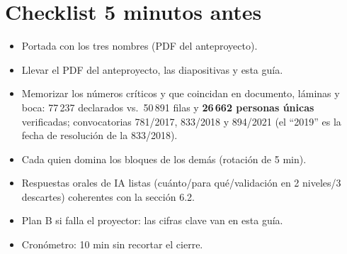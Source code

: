 \documentclass[11pt,a4paper]{article}
\begin{document}
\section*{Checklist 5 minutos antes}
\begin{itemize}
  \item [$\square$] Portada con los tres nombres (PDF del anteproyecto).
  \item [$\square$] Llevar el PDF del anteproyecto, las diapositivas y esta guía.
  \item [$\square$] Memorizar los números críticos y que coincidan en documento,
        láminas y boca: 77\,237 declarados vs.\ 50\,891 filas y \textbf{26\,662
        personas únicas} verificadas; convocatorias 781/2017, 833/2018 y
        894/2021 (el ``2019'' es la fecha de resolución de la 833/2018).
  \item [$\square$] Cada quien domina los bloques de los demás (rotación de 5 min).
  \item [$\square$] Respuestas orales de IA listas (cuánto/para qué/validación
        en 2 niveles/3 descartes) coherentes con la sección 6.2.
  \item [$\square$] Plan B si falla el proyector: las cifras clave van en esta guía.
  \item [$\square$] Cronómetro: 10 min sin recortar el cierre.
\end{itemize}
\end{document}
